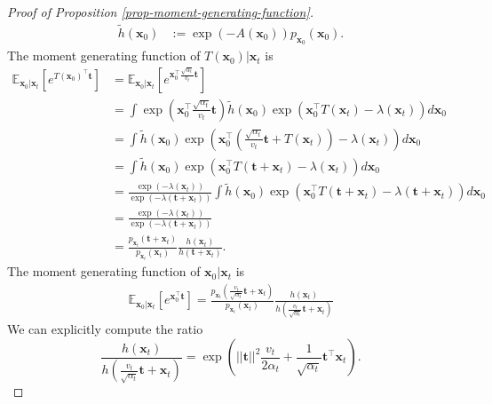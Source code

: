 \begin{proof}[Proof of Proposition \ref{prop-moment-generating-function}]
\begin{align}
    \tilde{h}(\mathbf{x}_0) &:= \exp(- A(\mathbf{x}_0))p_{\mathbf{x}_0}(\mathbf{x}_0).
\end{align}
The moment generating function of $T(\mathbf{x}_0)|\mathbf{x}_{t}$ is 
\begin{align}
    \mathbb{E}_{\mathbf{x}_{0}\vert\mathbf{x}_{t}}[e^{T(\mathbf{x}_0)^{\top} \mathbf{t}}] 
    &= \mathbb{E}_{\mathbf{x}_{0}\vert\mathbf{x}_{t}}[e^{\mathbf{x}_0^{\top}  \frac{\sqrt{\alpha_t}}{v_t} \mathbf{t}}]  \\
    &= \int \exp\left({\mathbf{x}_0^{\top} \frac{\sqrt{\alpha_t}}{v_t} \mathbf{t}}\right) \tilde{h}(\mathbf{x}_0) \exp\left({\mathbf{x}_0^{\top} T(\mathbf{x}_{t}) - \lambda(\mathbf{x}_t)} \right)  d\mathbf{x}_0\\
    &= \int  \tilde{h}(\mathbf{x}_0) \exp\left(\mathbf{x}_0^{\top} \left(\frac{\sqrt{\alpha_t}}{v_t} \mathbf{t} + T(\mathbf{x}_{t})\right) - \lambda(\mathbf{x}_t) \right)d\mathbf{x}_0\\
    &= \int  \tilde{h}(\mathbf{x}_0) \exp\left(\mathbf{x}_0^{\top} T( \mathbf{t} +\mathbf{x}_{t}) - \lambda(\mathbf{x}_t) \right)d\mathbf{x}_0\\
     &= \frac{\exp(- \lambda(\mathbf{x}_t))}{\exp(-\lambda(\mathbf{t} + \mathbf{x}_t))} \int  \tilde{h}(\mathbf{x}_0) \exp\left(\mathbf{x}_0^{\top} T( \mathbf{t} +\mathbf{x}_{t}) - \lambda(\mathbf{t} + \mathbf{x}_t) \right)d\mathbf{x}_0 \\
     &= \frac{\exp(- \lambda(\mathbf{x}_t))}{\exp(-\lambda(\mathbf{t} + \mathbf{x}_t))} \\
     &= \frac{p_{\mathbf{x}_t}( \mathbf{t} + \mathbf{x}_{t})}{p_{\mathbf{x}_t}( \mathbf{x}_{t})} \frac{h(\mathbf{x}_{t})}{h(\mathbf{t} + \mathbf{x}_{t})}.
\end{align}
The moment generating function of $\mathbf{x}_0|\mathbf{x}_{t}$ is 
\begin{align} \label{eq-moment-generating-before-ratio}
\mathbb{E}_{\mathbf{x}_{0}\vert\mathbf{x}_{t}}[e^{\mathbf{x}_0^{\top} \mathbf{t}}] = \frac{p_{\mathbf{x}_t}( \frac{v_t}{\sqrt{\alpha_t}}\mathbf{t} + \mathbf{x}_{t})}{p_{\mathbf{x}_t}( \mathbf{x}_{t})} \frac{h(\mathbf{x}_{t})}{h(\frac{v_t}{\sqrt{\alpha_t}}\mathbf{t} + \mathbf{x}_{t})}
\end{align}
We can explicitly compute the ratio
\begin{equation}
\frac{h(\mathbf{x}_{t})}{h(\frac{v_t}{\sqrt{\alpha_t}}\mathbf{t} + \mathbf{x}_{t})} = \exp\left(||\mathbf{t}||^2\frac{v_{t}}{2\alpha_{t}} + \frac{1}{\sqrt{\alpha_{t}}}\mathbf{t}^{\top}\mathbf{x}_{t}\right).

\end{equation}
\end{proof}
